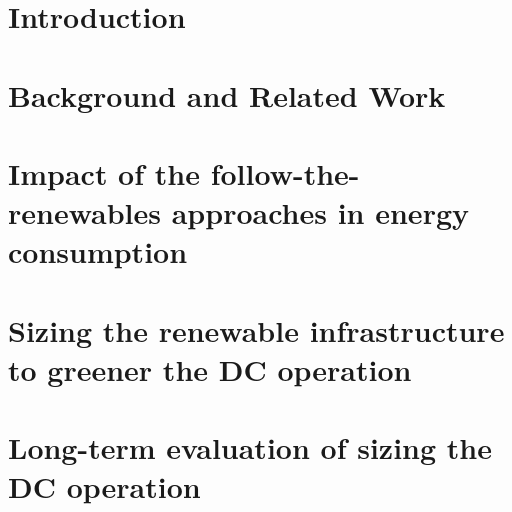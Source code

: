 
\chapter{Introduction} 
\label{chap:intro}





\chapter{Background and Related Work}
\label{chap:background}





\chapter[Impact of the follow-the-renewables approaches in energy consumption]{Impact of the follow-the-renewables approaches in energy consumption}
\label{chap:smartgreens}





\chapter[Sizing the renewable infrastructure to greener the DC operation]{Sizing the renewable infrastructure to greener the DC operation}
\label{chap:ccgrid}







\chapter[Long-term evaluation of sizing the DC operation]{Long-term evaluation of sizing the DC operation}
\label{chap:ccgrid-extension}

